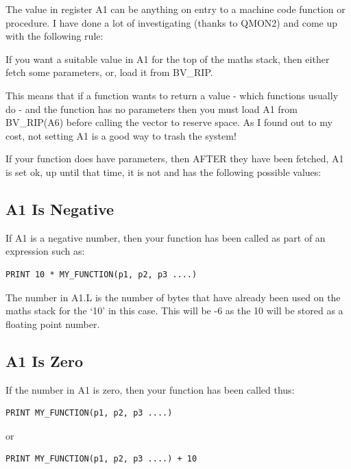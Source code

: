 The value in register A1 can be anything on entry to a machine code
    function or procedure. I have done a lot of investigating (thanks to
    QMON2) and come up with the following rule:

If you want a suitable value in A1 for the top of the maths stack,
    then either fetch some parameters, or, load it from BV\_RIP.

This means that if a function wants to return a value -{} which
    functions usually do -{} and the function has no parameters then you must
    load A1 from BV\_RIP(A6) before calling the  vector to reserve
    space. As I found out to my cost, not setting A1 is a good way to trash
    the system!

If your function does have parameters, then AFTER they have been
    fetched, A1 is set ok, up until that time, it is not and has the following
    possible values:

\subsection{A1 Is Negative}
\label{ch7-A1-negative}%

If A1 is a negative number, then your function has been called as
      part of an expression such as:

\begin{lstlisting}[firstnumber=1,]
PRINT 10 * MY_FUNCTION(p1, p2, p3 ....)
\end{lstlisting}

The number in A1.L is the number of bytes that have already been
      used on the maths stack for the `10' in this case. This will be -{}6 as
      the 10 will be stored as a floating point number.

\subsection{A1 Is Zero}
\label{ch7-A1-zero}%

If the number in A1 is zero, then your function has been called
      thus:

\begin{lstlisting}[firstnumber=1,]
PRINT MY_FUNCTION(p1, p2, p3 ....)
\end{lstlisting}

or

\begin{lstlisting}[firstnumber=1,]
PRINT MY_FUNCTION(p1, p2, p3 ....) + 10
\end{lstlisting}

